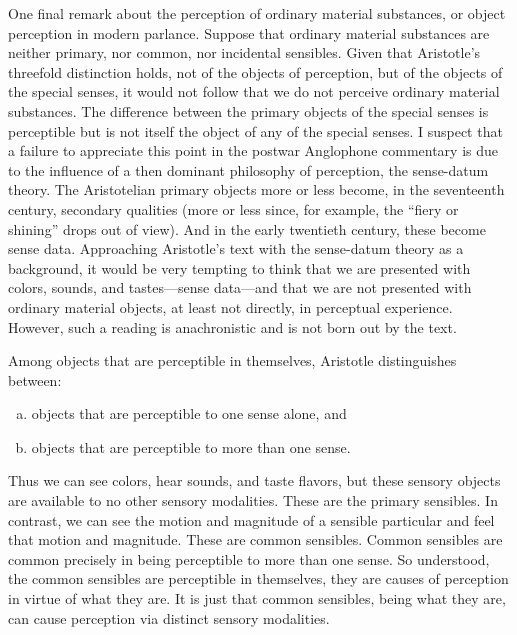 One final remark about the perception of ordinary material substances, or object perception in modern parlance. Suppose that ordinary material substances are neither primary, nor common, nor incidental sensibles. Given that Aristotle's threefold distinction holds, not of the objects of perception, but of the objects of the special senses, it would not follow that we do not perceive ordinary material substances. The difference between the primary objects of the special senses is perceptible but is not itself the object of any of the special senses. I suspect that a failure to appreciate this point in the postwar Anglophone commentary is due to the influence of a then dominant philosophy of perception, the sense-datum theory. The Aristotelian primary objects more or less become, in the seventeenth century, secondary qualities (more or less since, for example, the ``fiery or shining'' drops out of view). And in the early twentieth century, these become sense data. Approaching Aristotle's text with the sense-datum theory as a background, it would be very tempting to think that we are presented with colors, sounds, and tastes---sense data---and that we are not presented with ordinary material objects, at least not directly, in perceptual experience. However, such a reading is anachronistic and is not born out by the text.

Among objects that are perceptible in themselves, Aristotle distinguishes between:
\begin{enumerate}[(a)]
	\item objects that are perceptible to one sense alone, and
	\item objects that are perceptible to more than one sense.
\end{enumerate}
Thus we can see colors, hear sounds, and taste flavors, but these sensory objects are available to no other sensory modalities. These are the primary sensibles. In contrast, we can see the motion and magnitude of a sensible particular and feel that motion and magnitude. These are common sensibles. Common sensibles are common precisely in being perceptible to more than one sense. So understood, the common sensibles are perceptible in themselves, they are causes of perception in virtue of what they are. It is just that common sensibles, being what they are, can cause perception via distinct sensory modalities.

